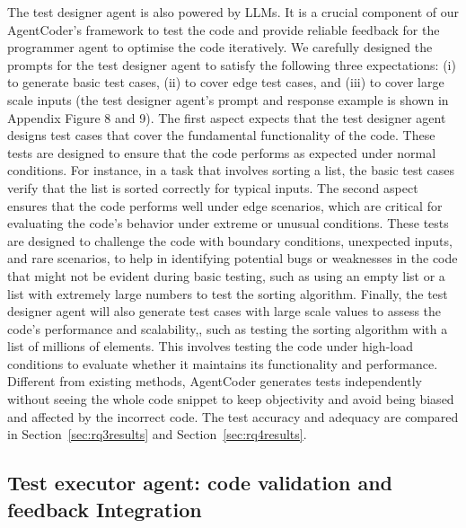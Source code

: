 \documentclass{article}
\newcommand{\xxx}{AgentCoder\xspace}
\begin{document}
The test designer agent is also powered by LLMs. It is a crucial component of our \xxx's framework to test the code and provide reliable feedback for the programmer agent to optimise the code iteratively.   
We carefully designed the prompts for the test designer agent to satisfy the following three expectations:
(i) to generate basic test cases, (ii) to cover edge test cases, and (iii) to cover large scale inputs (the test designer agent's prompt and response example is shown in Appendix Figure 8 and 9).
The first aspect expects that the test designer agent designs test cases that cover the fundamental functionality of the code. These tests are designed to ensure that the code performs as expected under normal conditions. For instance, in a task that involves sorting a list, the basic test cases  verify that the list is sorted correctly for typical inputs. 
The second aspect ensures that the code performs well under edge scenarios, which are critical for evaluating the code’s behavior under extreme or unusual conditions. 
These tests are designed to challenge the code with boundary conditions, unexpected inputs, and rare scenarios, to help in identifying potential bugs or weaknesses in the code that might not be evident during basic testing, such as using an empty list or a list with extremely large numbers to test the sorting algorithm.  
Finally, the test designer agent will also generate test cases with large scale values to assess the code’s performance and scalability,, such as testing the sorting algorithm with a list of millions of elements. This involves testing the code under high-load conditions to evaluate whether it maintains its functionality and performance. 
Different from existing methods, 
\xxx generates tests independently without seeing the whole code snippet to keep objectivity and avoid being biased and affected by the incorrect code. The test accuracy and adequacy are compared in Section~\ref{sec:rq3results} and Section~\ref{sec:rq4results}.




\subsection{Test executor agent: code validation and feedback Integration}
\end{document}
